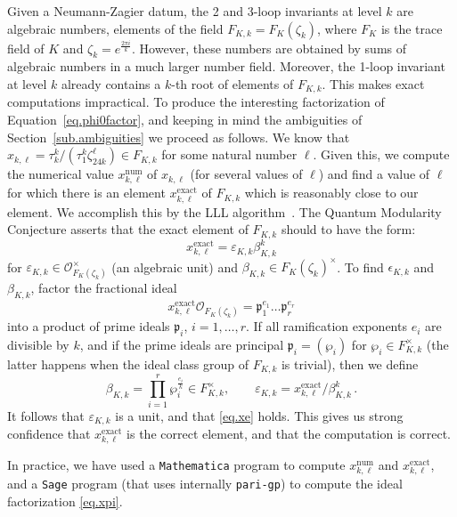 \documentclass[12pt]{amsart}
\theoremstyle{definition}
\def\calO{\mathcal O}
\def\be{  \begin{equation} }
\def\ee{  \end{equation} }
\begin{document}
Given a Neumann-Zagier datum, the 2 and 3-loop invariants at level $k$
are algebraic numbers, elements of the field $F_{K,k}=F_K(\zeta_k)$, 
where $F_K$ is the trace field of $K$ and $\zeta_k=e^{\frac{2\pi i}{k}}$.
However, these numbers are obtained by sums of algebraic numbers in a 
much larger number field. Moreover, the 1-loop invariant at level $k$
already contains a $k$-th root of elements of $F_{K,k}$. 
This makes exact computations impractical. To produce the
interesting factorization of Equation~\eqref{eq.phi0factor}, and keeping
in mind the ambiguities of Section~\ref{sub.ambiguities} we proceed as
follows. We know that 
$x_{k,\ell}=\tau^k_k/(\tau^k_1 \zeta_{24k}^\ell) \in F_{K,k}$
for some natural number $\ell$. Given this, we compute the numerical value
$x^{\mathrm{num}}_{k,\ell}$ of 
$x_{k,\ell}$ (for several values of $\ell$) and find a value of $\ell$ for which 
there is an element $x^{\mathrm{exact}}_{k,\ell}$ of $F_{K,k}$ which is 
reasonably close to our element. We accomplish this by the LLL
algorithm~\cite{LLL}. The Quantum Modularity Conjecture asserts that the 
exact element of $F_{K,k}$ should to have the form:
\be
\label{eq.xe}
x^{\mathrm{exact}}_{k,\ell} = \varepsilon_{K,k} \beta_{K,k}^k
\ee
for $\varepsilon_{K,k} \in \calO_{F_K(\zeta_k)}^{\times}$ (an algebraic unit)
and $\beta_{K,k} \in F_K(\zeta_k)^\times$. To find $\epsilon_{K,k}$ and 
$\beta_{K,k}$, factor the fractional ideal 
\be
\label{eq.xpi}
x^{\mathrm{exact}}_{k,\ell} \calO_{F_K(\zeta_k)} = 
\mathfrak{p}_1^{e_1} \dots \mathfrak{p}_r^{e_r} 
\ee
into a product of prime ideals $\mathfrak{p}_i$, $i=1,\dots,r$.
If all ramification exponents $e_i$ are divisible by $k$, and if the
prime ideals are principal $\mathfrak{p}_i=(\wp_i)$ for $\wp_i \in
F_{K,k}^\times$ (the latter happens when the ideal class group of 
$F_{K,k}$ is trivial), then we define
$$
\beta_{K,k}=\prod_{i=1}^r \wp_i^{\frac{e_i}{k}} \in F_{K,k}^\times, \qquad
\varepsilon_{K,k}= x^{\mathrm{exact}}_{k,\ell}/\beta_{K,k}^k \,.
$$
It follows that $\varepsilon_{K,k}$ is a unit, and that \eqref{eq.xe}
holds. This gives us strong confidence that $x^{\mathrm{exact}}_{k,\ell}$
is the correct element, and that the computation is correct.

In practice, we have used a {\tt Mathematica} program to compute 
$x^{\mathrm{num}}_{k,\ell}$ and $x^{\mathrm{exact}}_{k,\ell}$, and a {\tt Sage}
program (that uses internally {\tt pari-gp}) to compute the ideal 
factorization \eqref{eq.xpi}.

\end{document}

